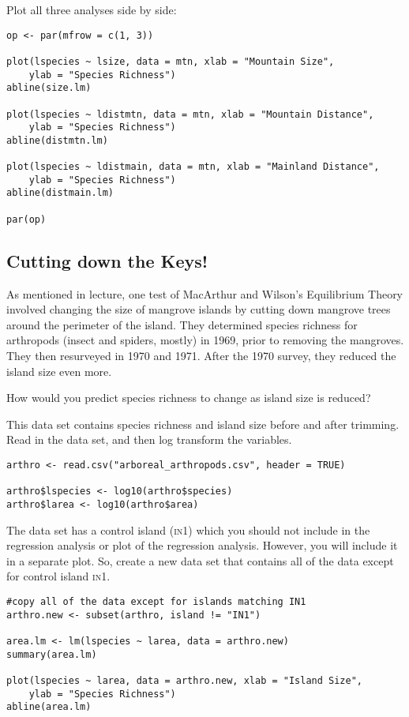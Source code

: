 \documentclass[11pt]{article}
\begin{document}
\vspace{3\baselineskip}


Plot all three analyses side by side:

\begin{verbatim}
op <- par(mfrow = c(1, 3))

plot(lspecies ~ lsize, data = mtn, xlab = "Mountain Size",  
    ylab = "Species Richness")
abline(size.lm)

plot(lspecies ~ ldistmtn, data = mtn, xlab = "Mountain Distance",
    ylab = "Species Richness")
abline(distmtn.lm)

plot(lspecies ~ ldistmain, data = mtn, xlab = "Mainland Distance",
    ylab = "Species Richness")
abline(distmain.lm)

par(op)
\end{verbatim}


\subsection*{Cutting down the Keys!}

As mentioned in lecture, one test of MacArthur and Wilson's Equilibrium Theory involved changing the size of mangrove islands by cutting down mangrove trees around the perimeter of the island.  They determined species richness for arthropods (insect and spiders, mostly) in 1969, prior to removing the mangroves. They then resurveyed in 1970 and 1971.  After the 1970 survey, they reduced the island size even more. 

How would you predict species richness to change as island size is reduced?

This data set contains species richness and island size before and after trimming.  Read in the data set, and then log transform the variables.

\begin{verbatim}
arthro <- read.csv("arboreal_arthropods.csv", header = TRUE)

arthro$lspecies <- log10(arthro$species)
arthro$larea <- log10(arthro$area)
\end{verbatim}

The data set has a control island (\textsc{in}1) which you should not include in the regression analysis or plot of the regression analysis.  However, you will include it in a separate plot.  So,  create a new data set that contains all of the data except for control island \textsc{in}1.

\newpage

\begin{verbatim}
#copy all of the data except for islands matching IN1
arthro.new <- subset(arthro, island != "IN1")  

area.lm <- lm(lspecies ~ larea, data = arthro.new)
summary(area.lm)

plot(lspecies ~ larea, data = arthro.new, xlab = "Island Size",
    ylab = "Species Richness")
abline(area.lm)

\end{verbatim}
\end{document}
